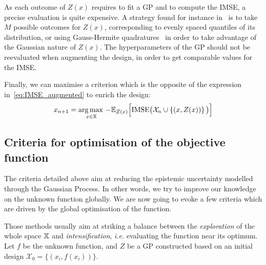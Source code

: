 \documentclass[../../Main_ManuscritThese.tex]{subfiles}
\newcommand\imgpath{/home/victor/acadwriting/Manuscrit/Text/Chapter4/img/}
\begin{document}
As each outcome of $Z(x)$ requires to fit a GP and to compute the
IMSE, a precise evaluation is quite expensive. A strategy found for
instance in~\cite{villemonteix_informational_2006} is to take $M$
possible outcomes for $Z(x)$, corresponding to evenly spaced quantiles
of its distribution, or using Gauss-Hermite
quadratures~\citep{bernard_methodes_2019} in order to take advantage
of the Gaussian nature of $Z(x)$.  The hyperparameters of the GP
should not be reevaluated when augmenting the design, in order to get
comparable values for the IMSE.\@

Finally, we can maximise a criterion which is the opposite of the
expression in~\cref{eq:IMSE_augmented} to enrich the design:
\begin{equation}
  x_{n+1} = \operatorname*{arg\,max \,}_{x\in \mathbb{X}}-\mathbb{E}_{Z(x)}\Big[\mathrm{IMSE} \big(\mathcal{X}_n \cup \left\{(x, Z(x))\right\} \big)\Big]
\end{equation}

%   


\subsection{Criteria for optimisation of the objective function}
\label{sec:GP_optimization_criteria}
The criteria detailed above aim at reducing the epistemic uncertainty
modelled through the Gaussian Process. In other words, we try to
improve our knowledge on the unknown function globally. We are now
going to evoke a few criteria which are driven by the global
optimisation of the function.

Those methods usually aim at striking a balance between the
\emph{exploration} of the whole space $\mathbb{X}$ and
\emph{intensification}, \textit{i.e.} evaluating the function near its
optimum.  Let $f$ be the unknown function, and $Z$ be a GP constructed
based on an initial design $\mathcal{X}_0 = \{(x_i, f(x_i))\}$.
\end{document}
